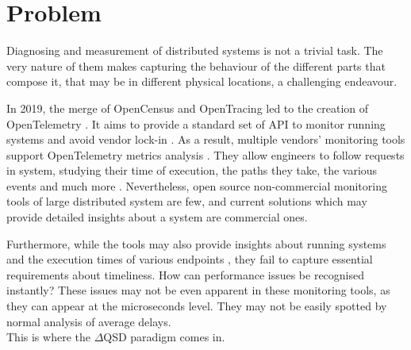 \section{Problem}
    Diagnosing and measurement of distributed systems is not a trivial task. The very nature of them makes capturing the behaviour of the different parts that compose it, that may be in different physical locations, a challenging endeavour. \cite{dist-m}

    In 2019, the merge of OpenCensus and OpenTracing led to the creation of OpenTelemetry \cite{openc}. It aims to provide a standard set of API to monitor running systems and avoid vendor lock-in \cite{otel-v}. As a result, multiple vendors' monitoring tools support OpenTelemetry metrics analysis \cite{otel-ven}. They allow engineers to follow requests in system, studying their time of execution, the paths they take, the various events and much more \cite{otel-t}. Nevertheless, open source non-commercial monitoring tools of large distributed system are few, and current solutions which may provide detailed insights about a system are commercial ones. \cite{otel-aw} 

    Furthermore, while the tools may also provide insights about running systems and the execution times of various endpoints \cite{jag-spm}, they fail to capture essential requirements about timeliness. How can performance issues be recognised instantly? These issues may not be even apparent in these monitoring tools, as they can appear at the microseconds level. They may not be easily spotted by normal analysis of average delays. \\
    This is where the $\Delta$QSD paradigm comes in.



